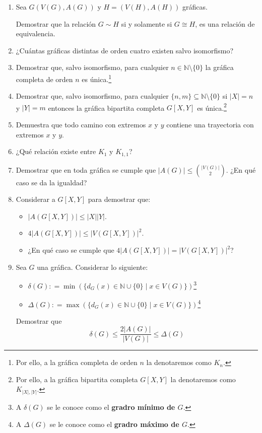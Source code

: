\documentclass[10pt]{report}
\numberwithin{section}{chapter}
\newcommand{\N}{\mathbb N}
\begin{document}
\begin{enumerate}
\item Sea $G(V(G), A(G))$ y $H=(V(H), A(H))$ gráficas.

Demostrar que la relación $G \sim H$ si y solamente si $G \cong H$, es una relación de equivalencia.

\item ¿Cuántas gráficas distintas de orden cuatro existen salvo isomorfismo?

\item Demostrar que, salvo isomorfismo, para cualquier $n \in \N \setminus\{0\}$ la gráfica completa de orden $n$ es única.\footnote{Por ello, a la gráfica completa de orden $n$ la denotaremos como $K_n$.}

\item Demostrar que, salvo isomorfismo, para cualquier $\{n,m\} \subseteq \N \setminus\{0\}$ si $|X| = n$ y $|Y|=m$ entonces la gráfica bipartita completa $G[X,Y]$ es única.\footnote{Por ello, a la gráfica bipartita completa $G[X,Y]$ la denotaremos como $K_{|X|,|Y|}$.}

\item Demuestra que todo camino con extremos $x$ y $y$ contiene una trayectoria con extremos $x$ y $y$.

\item ¿Qué relación existe entre $K_1$ y $K_{1,1}$?

\item Demostrar que en toda gráfica se cumple que $|A(G)| \leq {|V(G)|\choose 2}$. ¿En qué caso se da la igualdad?

\item Considerar a $G[X,Y]$ para demostrar que:
\begin{itemize}
\item $|A(G[X,Y])| \leq |X||Y|$.
\item $4 |A(G[X,Y])| \leq |V(G[X,Y])|^2$.
\item ¿En qué caso se cumple que $4 |A(G[X,Y])| = |V(G[X,Y])|^2$?
\end{itemize}

\item Sea $G$ una gráfica. Considerar lo siguiente:
\begin{itemize}
\item $\delta (G) : = \min(\{d_G(x) \in \N \cup \{0\} \; | \; x \in V(G) \})$\footnote{A $\delta(G)$ se le conoce como el \textbf{gradro mínimo de $G$}.}
\item $\Delta (G) : = \max(\{d_G(x) \in \N \cup \{0\} \; | \; x \in V(G) \})$\footnote{A $\Delta(G)$ se le conoce como el \textbf{gradro máximo de $G$}.}
\end{itemize}
Demostrar que $$ \delta(G) \leq \frac{2 |A(G)|}{|V(G)|} \leq \Delta(G)$$



\end{enumerate}
\end{document}
